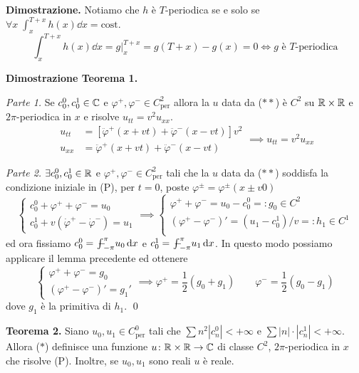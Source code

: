 \textbf{Dimostrazione.}
Notiamo che $h$ è $T$-periodica se e solo se $\forall x \; \int_{x}^{T+x} h(x) \dd x = \text{cost.}$
$$
\int_{x}^{T+x} h(x) \dd x = g \Big|_x^{T+x} = g(T + x) - g(x) = 0 \iff \text{$g$ è $T$-periodica}
$$

\textbf{Dimostrazione Teorema 1.}

\textit{Parte 1.}
Se $c_0^0, c_0^1 \in \mathbb C$ e $\varphi^+, \varphi^- \in C^2_\text{per}$ allora la $u$ data da ($**$) è $C^2$ su $\mathbb R \times \mathbb R$ e $2\pi$-periodica in $x$ e risolve $u_{tt} = v^2 u_{xx}$.
$$
\begin{aligned}
	u_{tt} &= [\ddot \varphi^+(x + vt) + \ddot \varphi^-(x - vt)] v^2 \\
	u_{xx} &= \ddot \varphi^+(x + vt) + \ddot \varphi^-(x - vt)
\end{aligned}
\implies u_{tt} = v^2 u_{xx}
$$

\textit{Parte 2.}
$\exists c_0^0, c_0^1 \in \mathbb R$ e $\varphi^+, \varphi^- \in C^2_\text{per}$ tali che la $u$ data da ($**$) soddisfa la condizione iniziale in (P), per $t = 0$, poste $\varphi^\pm = \varphi^\pm(x \pm v0)$
$$
\begin{cases}
	c_0^0 + \varphi^+ + \varphi^- = u_0 \\
	c_0^1 + v(\dot \varphi^+ - \dot \varphi^-) = u_1
\end{cases}
\implies
\begin{cases}
	\varphi^+ + \varphi^- = u_0 - c_0^0 =: g_0 \in C^2 \\
	(\varphi^+ - \varphi^-)' = (u_1 - c_0^1) / v =: h_1 \in C^1 \\
\end{cases}
$$
ed ora fissiamo $c_0^0 = \avint_{-\pi}^\pi u_0 \dd x$ e $c_0^1 = \avint_{-\pi}^\pi u_1 \dd x$. In questo modo possiamo applicare il lemma precedente ed ottenere
$$
\begin{cases}
	\varphi^+ + \varphi^- = g_0 \\
	(\varphi^+ - \varphi^-)' = g_1'
\end{cases}
\implies
\varphi^+ = \frac{1}{2}(g_0 + g_1)
\qquad
\varphi^- = \frac{1}{2}(g_0 - g_1)
$$
dove $g_1$ è la primitiva di $h_1$.
\qed


\textbf{Teorema 2.}
Siano $u_0, u_1 \in C^0_\text{per}$ tali che $\sum n^2 |c_n^0| < +\infty$ e $\sum |n| \cdot |c_n^1| < +\infty$. Allora ($*$) definisce una funzione $u \colon \mathbb R \times \mathbb R \to \mathbb C$ di classe $C^2$, $2\pi$-periodica in $x$ che risolve (P). Inoltre, se $u_0,u_1$ sono reali $u$ è reale.

